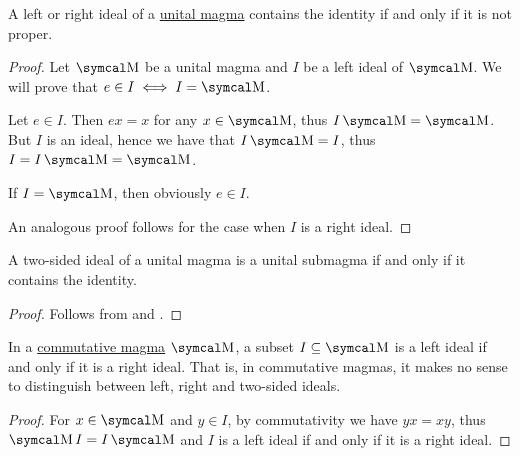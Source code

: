 \begin{proposition}\label{thm:proper_ideals_containing_identity}
  A left or right ideal of a \hyperref[def:unital_magma]{unital magma} contains the identity if and only if it is not proper.
\end{proposition}
\begin{proof}
  Let \( \CM \) be a unital magma and \( I \) be a left ideal of \( \CM \). We will prove that \( e \in I \iff I = \CM \).

  \Sufficiency Let \( e \in I \). Then \( ex = x \) for any \( x \in \CM \), thus \( I\CM = \CM \). But \( I \) is an ideal, hence we have that \( I\CM = I \), thus \( I = I\CM = \CM \).

  \Necessity If \( I = \CM \), then obviously \( e \in I \).

  An analogous proof follows for the case when \( I \) is a right ideal.
\end{proof}

\begin{corollary}\label{thm:unital_magma_ideal_is_submagma_iff_contains_identity}
  A two-sided ideal of a unital magma is a unital submagma if and only if it contains the identity.
\end{corollary}
\begin{proof}
  Follows from  and .
\end{proof}

\begin{proposition}\label{thm:commutative_magma_ideals}
  In a \hyperref[def:magma/commutative]{commutative magma} \( \CM \), a subset \( I \subseteq \CM \) is a left ideal if and only if it is a right ideal. That is, in commutative magmas, it makes no sense to distinguish between left, right and two-sided ideals.
\end{proposition}
\begin{proof}
  For \( x \in \CM \) and \( y \in I \), by commutativity we have \( yx = xy \), thus \( \CM I = I \CM \) and \( I \) is a left ideal if and only if it is a right ideal.
\end{proof}

